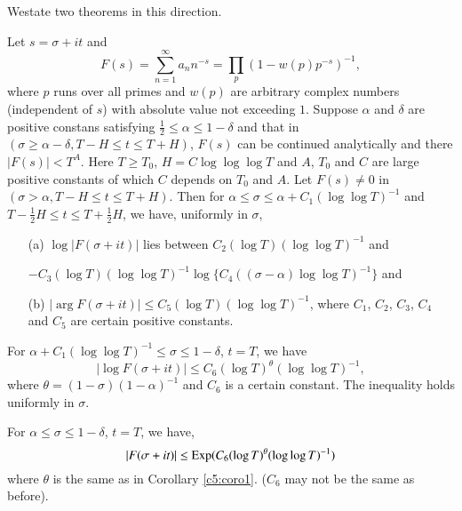 We\pageoriginale state two theorems in this direction.

\begin{theorem}\label{c5:thm5.3.1}
Let $s=\sigma+it$ and
\begin{equation*}
F(s)=\sum^{\infty}_{n=1}a_{n}n^{-s}=\prod_{p}(1-w(p)p^{-s})^{-1},\tag{5.3.1}\label{c5:eq5.3.1} 
\end{equation*}
where $p$ runs over all primes and $w(p)$ are arbitrary complex
numbers (independent of $s$) with absolute value not exceeding
$1$. Suppose $\alpha$ and $\delta$ are positive constans satisfying
$\frac{1}{2}\leq \alpha\leq 1-\delta$ and that in $(\sigma\geq
\alpha-\delta, T-H\leq t\leq T+H)$, $F(s)$ can be continued
analytically and there $|F(s)|<T^{A}$. Here $T\geq T_{0}$, $H=C
\log\log\log T$ and $A$, $T_{0}$ and $C$ are large positive constants
of which $C$ depends on $T_{0}$ and $A$. Let $F(s)\neq 0$ in
$(\sigma>\alpha,T-H\leq t\leq T+H)$. Then for $\alpha\leq \sigma\leq
\alpha+C_{1}(\log\log T)^{-1}$ and $T-\frac{1}{2}H\leq t\leq
T+\frac{1}{2}H$, we have, uniformly in $\sigma$,
\begin{itemize}
\item[\rm(a)] $\log |F(\sigma+it)|$ lies between $C_{2}(\log
  T)(\log\log T)^{-1}$ and

$-C_{3}(\log T)(\log\log T)^{-1}\log \{C_{4}((\sigma-\alpha)\log\log
  T)^{-1}\}$ and

\item[\rm(b)] $|\arg F(\sigma+it)|\leq C_{5}(\log T)(\log\log
  T)^{-1}$, where $C_{1}$, $C_{2}$, $C_{3}$, $C_{4}$ and $C_{5}$ are
  certain positive constants.
\end{itemize}
\end{theorem}

\begin{corollary}\label{c5:coro1}
For $\alpha+C_{1}(\log\log T)^{-1}\leq \sigma\leq 1-\delta$, $t=T$, we
have 
$$
|\log F(\sigma+it)|\leq C_{6}(\log T)^{\theta}(\log\log T)^{-1},
$$
where $\theta=(1-\sigma)(1-\alpha)^{-1}$ and $C_{6}$ is a certain
constant. The inequality holds uniformly in $\sigma$. 
\end{corollary}

\begin{corollary}\label{c5:coro2}
For $\alpha\leq \sigma\leq 1-\delta$, $t=T$, we have,
$$
|F(\sigma+it)|\leq \operatorname{Exp}(C_{6}(\log T)^{\theta}(\log\log T)^{-1})
$$
where $\theta$ is the same as in Corollary \ref{c5:coro1}. ($C_{6}$
may not be the same as before).
\end{corollary}

